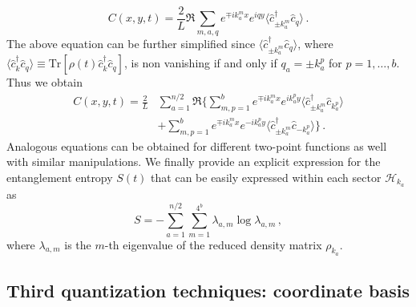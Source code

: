 \begin{equation}
    C(x,y,t)=\frac{2}{L}\Re{\sum_{m, a, q}e^{\mp ik_a^m x}e^{iqy}\langle\hat{c}^\dagger_{\pm k_a^m}\hat{c}_q\rangle}\,.
\end{equation}
The above equation can be further simplified since $\langle\hat{c}^\dagger_{\pm k_a^m}\hat{c}_q\rangle$, where $\langle\hat{c}^\dagger_{k}\hat{c}_q\rangle\equiv \text{Tr}[\rho(t)\hat{c}^\dagger_k\hat{c}_q]$, is non vanishing if and only if $q_a=\pm k^{p}_a$ for $p=1,\dots,b$. Thus we obtain
\begin{equation}
\begin{aligned}
    C(x,y,t)=\frac{2}{L}&\sum_{a=1}^{n/2}\Re\bigg\{\sum_{m,p=1}^be^{\mp ik_a^mx}e^{ik^{p}_a y}\langle\hat{c}^\dagger_{\pm k_a^m}\hat{c}_{k^{p}_a}\rangle\\
    &+\sum_{m,p=1}^be^{\mp ik_a^m x}e^{-ik^{p}_a y}\langle\hat{c}^\dagger_{\pm k_a^m}\hat{c}_{-k^{p}_a}\rangle\bigg\}\,.
\end{aligned}
\end{equation}
Analogous equations can be obtained for different two-point functions as well with similar manipulations. We finally provide an explicit expression for the entanglement entropy $S(t)$ that can be easily expressed within each sector $\mathcal{H}_{k_a}$ as
\begin{equation}
S=-\sum_{a=1}^{n/2}\sum_{m=1}^{4^b}\lambda_{a,m}\log\lambda_{a,m}\,,
\label{eq_def_entropies_momentum_space}
\end{equation}
where $\lambda_{a,m}$ is the $m$-th eigenvalue of the reduced density matrix $\rho_{k_a}$. 

\subsection{Third quantization techniques: coordinate basis}
\label{sec_app_thirdquant_coordspace}

